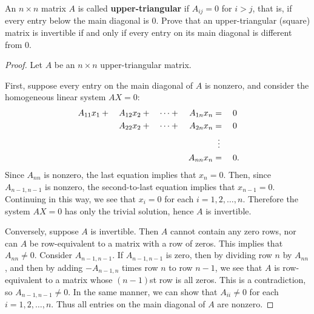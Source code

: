  An $n\times n$ matrix $A$ is called {\bf upper-triangular}
if $A_{ij} = 0$ for $i > j$, that is, if every entry below the main
diagonal is $0$. Prove that an upper-triangular (square) matrix is
invertible if and only if every entry on its main diagonal is
different from $0$.
\begin{proof}
  Let $A$ be an $n\times n$ upper-triangular matrix.

  First, suppose every entry on the main diagonal of $A$ is nonzero,
  and consider the homogeneous linear system $AX = 0$:
  \begin{alignat*}{5}
    A_{11}x_1 &{}+{}& A_{12}x_2 &{}+{}& \cdots &{}+{}& A_{1n}x_n &{}={}& 0 \\
    && A_{22}x_2 &{}+{}& \cdots &{}+{}& A_{2n}x_n &{}={}& 0 \\
    && && && &\;\;\vdots \\
    && && && A_{nn}x_n &{}={}& 0\rlap.
  \end{alignat*}
  Since $A_{nn}$ is nonzero, the last equation implies that $x_n =
  0$. Then, since $A_{n-1,n-1}$ is nonzero, the second-to-last
  equation implies that $x_{n-1} = 0$. Continuing in this way, we see
  that $x_i = 0$ for each $i = 1, 2, \dots, n$. Therefore the system
  $AX = 0$ has only the trivial solution, hence $A$ is invertible.

  Conversely, suppose $A$ is invertible. Then $A$ cannot contain any
  zero rows, nor can $A$ be row-equivalent to a matrix with a row of
  zeros. This implies that $A_{nn}\neq0$. Consider $A_{n-1,n-1}$. If
  $A_{n-1,n-1}$ is zero, then by dividing row $n$ by $A_{nn}$, and
  then by adding $-A_{n-1,n}$ times row $n$ to row $n-1$, we see that
  $A$ is row-equivalent to a matrix whose $(n-1)$st row is all
  zeros. This is a contradiction, so $A_{n-1,n-1}\neq0$. In the same
  manner, we can show that $A_{ii}\neq0$ for each $i =
  1,2,\dots,n$. Thus all entries on the main diagonal of $A$ are
  nonzero.
\end{proof}



